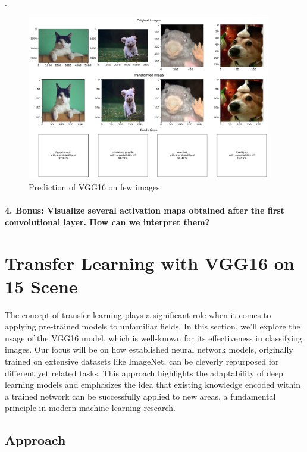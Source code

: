 .

\begin{figure}[H]
    \centering
    \includegraphics*[width=0.95\textwidth]{predictions.pdf}
    \caption{Prediction of VGG16 on few images}
\end{figure} %

\paragraph{4. \textbf{Bonus}: Visualize several activation maps obtained after the first convolutional layer. How can we interpret them?}

\section{Transfer Learning with VGG16 on 15 Scene}

The concept of transfer learning plays a significant role when it comes to applying pre-trained models to unfamiliar fields. In this section, we'll explore the usage of the VGG16 model, which is well-known for its effectiveness in classifying images. Our focus will be on how established neural network models, originally trained on extensive datasets like ImageNet, can be cleverly repurposed for different yet related tasks. This approach highlights the adaptability of deep learning models and emphasizes the idea that existing knowledge encoded within a trained network can be successfully applied to new areas, a fundamental principle in modern machine learning research.

\subsection{Approach}
